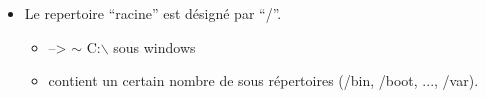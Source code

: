 \documentclass[10pt, xcolor=dvipsnames]{beamer}
\begin{document}
\begin{frame}[fragile]
\setlength{\unitlength}{1mm}

\end{frame}

\begin{frame}[fragile]
    
        \begin{itemize}
        \item Le repertoire ``racine'' est désigné par ``/''.
            \begin{itemize}
            \item --> $\sim$  C:$\backslash$ sous windows 
            \item contient un certain nombre de sous répertoires (/bin, /boot, ..., /var).
            \end{itemize}
        \end{itemize}

\end{frame}
\end{document}
